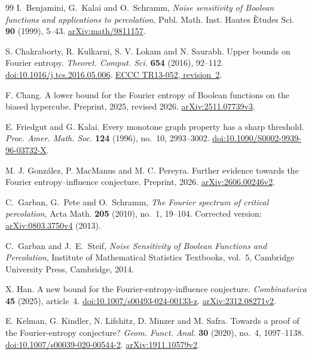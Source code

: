 \begin{thebibliography}{99}
I.~Benjamini, G.~Kalai and O.~Schramm,
\emph{Noise sensitivity of Boolean functions and applications to percolation},
Publ. Math. Inst. Hautes \`Etudes Sci. \textbf{90} (1999), 5--43.
\href{https://arxiv.org/abs/math/9811157}{arXiv:math/9811157}.

S. Chakraborty, R. Kulkarni, S. V. Lokam and N. Saurabh.
Upper bounds on Fourier entropy.
\emph{Theoret. Comput. Sci.} \textbf{654} (2016), 92--112.
\href{https://doi.org/10.1016/j.tcs.2016.05.006}{doi:10.1016/j.tcs.2016.05.006}.
\href{https://eccc.weizmann.ac.il/report/2013/052/revision/2/}{ECCC TR13-052, revision~2}.

F. Chang.
A lower bound for the Fourier entropy of Boolean functions on the biased hypercube.
Preprint, 2025, revised 2026.
\href{https://arxiv.org/abs/2511.07739v3}{arXiv:2511.07739v3}.

E. Friedgut and G. Kalai.
Every monotone graph property has a sharp threshold.
\emph{Proc. Amer. Math. Soc.} \textbf{124} (1996), no.~10, 2993--3002.
\href{https://doi.org/10.1090/S0002-9939-96-03732-X}{doi:10.1090/S0002-9939-96-03732-X}.

M. J. Gonz\'alez, P. MacManus and M. C. Pereyra.
Further evidence towards the Fourier entropy--influence conjecture.
Preprint, 2026.
\href{https://arxiv.org/abs/2606.00246v2}{arXiv:2606.00246v2}.

C.~Garban, G.~Pete and O.~Schramm,
\emph{The Fourier spectrum of critical percolation},
Acta Math. \textbf{205} (2010), no.~1, 19--104.
Corrected version: \href{https://arxiv.org/abs/0803.3750}{arXiv:0803.3750v4} (2013).

C.~Garban and J.~E.~Steif,
\emph{Noise Sensitivity of Boolean Functions and Percolation},
Institute of Mathematical Statistics Textbooks, vol.~5,
Cambridge University Press, Cambridge, 2014.

X. Han.
A new bound for the Fourier-entropy-influence conjecture.
\emph{Combinatorica} \textbf{45} (2025), article~4.
\href{https://doi.org/10.1007/s00493-024-00133-z}{doi:10.1007/s00493-024-00133-z}.
\href{https://arxiv.org/abs/2312.08271v2}{arXiv:2312.08271v2}.

E. Kelman, G. Kindler, N. Lifshitz, D. Minzer and M. Safra.
Towards a proof of the Fourier-entropy conjecture?
\emph{Geom. Funct. Anal.} \textbf{30} (2020), no.~4, 1097--1138.
\href{https://doi.org/10.1007/s00039-020-00544-2}{doi:10.1007/s00039-020-00544-2}.
\href{https://arxiv.org/abs/1911.10579v2}{arXiv:1911.10579v2}.


\end{thebibliography}
